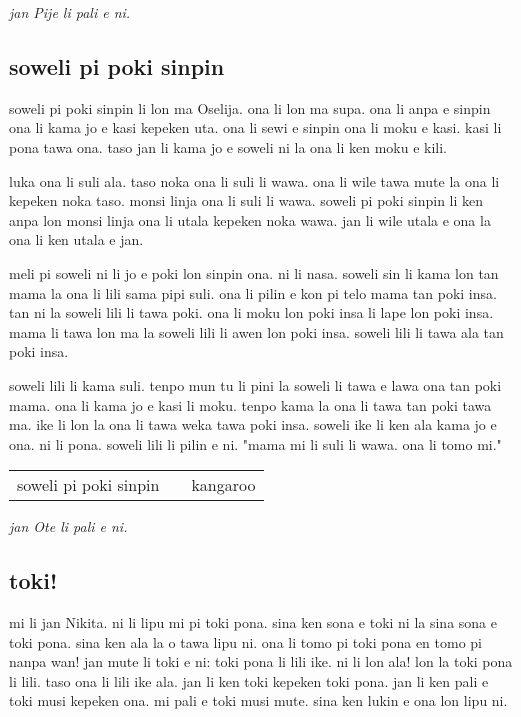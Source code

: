 \textit{jan Pije li pali e ni. \cite{www:Pije:01}}
%
\subsection{soweli pi poki sinpin}

soweli pi poki sinpin li lon ma Oselija.
ona li lon ma supa.
ona li anpa e sinpin ona li kama jo e kasi kepeken uta.
ona li sewi e sinpin ona li moku e kasi.
kasi li pona tawa ona.
taso jan li kama jo e soweli ni la ona li ken moku e kili.

luka ona li suli ala.
taso noka ona li suli li wawa.
ona li wile tawa mute la ona li kepeken noka taso.
monsi linja ona li suli li wawa.
soweli pi poki sinpin li ken anpa lon monsi linja ona li utala kepeken noka wawa.
jan li wile utala e ona la ona li ken utala e jan.

meli pi soweli ni li jo e poki lon sinpin ona.
ni li nasa.
soweli sin li kama lon tan mama la ona li lili sama pipi suli.
ona li pilin e kon pi telo mama tan poki insa.
tan ni la soweli lili li tawa poki.
ona li moku lon poki insa li lape lon poki insa.
mama li tawa lon ma la soweli lili li awen lon poki insa.
soweli lili li tawa ala tan poki insa.

soweli lili li kama suli.
tenpo mun tu li pini la soweli li tawa e lawa ona tan poki mama.
ona li kama jo e kasi li moku.
tenpo kama la ona li tawa tan poki tawa ma.
ike li lon la ona li tawa weka tawa poki insa.
soweli ike li ken ala kama jo e ona.
ni li pona.
soweli lili li pilin e ni.
"mama mi li suli li wawa.
ona li tomo mi."

\begin{supertabular}{p{5,5cm}|ll}
soweli pi poki sinpin && kangaroo \\ 
\end{supertabular}

\textit{jan Ote li pali e ni. \cite{www:sowelitoki:01}}
%
%
\subsection{toki!}

mi li jan Nikita. ni li lipu mi pi toki pona. sina ken sona e toki ni la sina sona e toki pona. sina ken ala la o tawa lipu ni. ona li tomo pi toki pona en tomo pi nanpa wan! 
jan mute li toki e ni: toki pona li lili ike. ni li lon ala! lon la toki pona li lili. taso ona li lili ike ala. jan li ken toki kepeken toki pona. jan li ken pali e toki musi kepeken ona. 
mi pali e toki musi mute. sina ken lukin e ona lon lipu ni.

